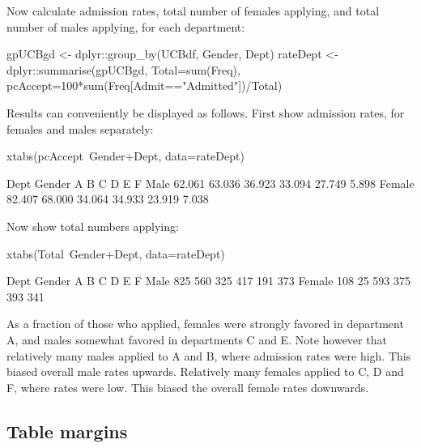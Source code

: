 Now calculate admission rates, total number of females applying,
and total number of males applying, for each department:
\begin{Schunk}
\begin{Sinput}
gpUCBgd <- dplyr::group_by(UCBdf, Gender, Dept)
rateDept <- dplyr::summarise(gpUCBgd,
    Total=sum(Freq),
    pcAccept=100*sum(Freq[Admit=="Admitted"])/Total)
\end{Sinput}
\end{Schunk}

Results can conveniently be displayed as follows.  First show
admission rates, for females and males separately:
\begin{Schunk}
\begin{Sinput}
xtabs(pcAccept~Gender+Dept, data=rateDept)
\end{Sinput}
\begin{Soutput}
        Dept
Gender        A      B      C      D      E      F
  Male   62.061 63.036 36.923 33.094 27.749  5.898
  Female 82.407 68.000 34.064 34.933 23.919  7.038
\end{Soutput}
\end{Schunk}

Now show total numbers applying:
\begin{Schunk}
\begin{Sinput}
xtabs(Total~Gender+Dept, data=rateDept)
\end{Sinput}
\begin{Soutput}
        Dept
Gender     A   B   C   D   E   F
  Male   825 560 325 417 191 373
  Female 108  25 593 375 393 341
\end{Soutput}
\end{Schunk}

As a fraction of those who applied, females were strongly favored
in department A, and males somewhat favored in departments C and E.
Note however that relatively many males applied to A and B, where admission
  rates were high. This biased overall male rates upwards. Relatively
  many females applied to C, D and F, where rates were low.
  This biased the overall female rates downwards.

\subsection{Table margins}

